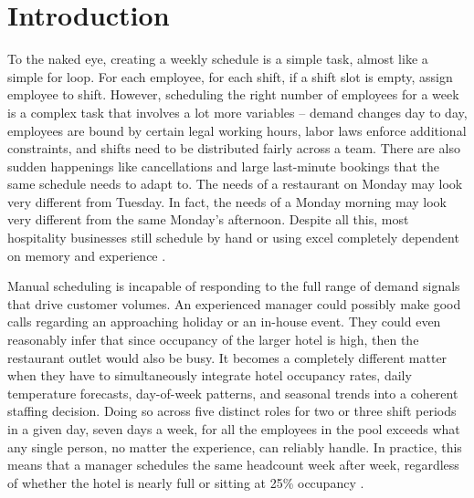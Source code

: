 \documentclass[12pt,a4paper,oneside]{article}
\begin{document}
\newpage
\thispagestyle{plain}
\tableofcontents
\newpage

\section{Introduction}
\label{sec:introduction}


To the naked eye, creating a weekly schedule is a simple task, almost like a simple for loop. For each employee, for each shift, if a shift slot is empty, assign employee to shift. However, scheduling the right number of employees for a week is a complex task that involves a lot more variables --  demand changes day to day, employees are bound by certain legal working hours, labor laws enforce additional constraints, and shifts need to be distributed fairly across a team. There are also sudden happenings like cancellations and large last-minute bookings that the same schedule needs to adapt to. The needs of a restaurant on Monday may look very different from Tuesday. In fact, the needs of a Monday morning may look very different from the same Monday's afternoon. Despite all this, most hospitality businesses still schedule by hand or using excel completely dependent on memory and experience \citep{thompson2004}.

Manual scheduling is incapable of responding to the full range of demand signals that drive customer volumes. An experienced manager could possibly make good calls regarding an approaching holiday or an in-house event.  They could even reasonably infer that since occupancy of the larger hotel is high, then the restaurant outlet would also be busy. It becomes a completely different matter when they have to simultaneously integrate hotel occupancy rates, daily temperature forecasts, day-of-week patterns, and seasonal trends into a coherent staffing decision. Doing so across five distinct roles for two or three shift periods in a given day, seven days a week, for all the employees in the pool exceeds what any single person, no matter the experience, can reliably handle. In practice, this means that a manager schedules the same headcount week after week, regardless of whether the hotel is nearly full or sitting at 25\% occupancy \citep{choi2009}.
\end{document}
